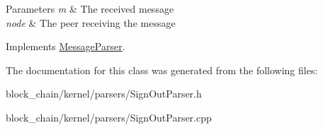 \begin{DoxyParams}{Parameters}
{\em m} & The received message \\
\hline
{\em node} & The peer receiving the message \\
\hline
\end{DoxyParams}


Implements \mbox{\hyperlink{classMessageParser_a946f3b936dc01a75d6165329b159ecfe}{Message\+Parser}}.



The documentation for this class was generated from the following files\+:\begin{DoxyCompactItemize}
\item 
block\+\_\+chain/kernel/parsers/Sign\+Out\+Parser.\+h\item 
block\+\_\+chain/kernel/parsers/Sign\+Out\+Parser.\+cpp\end{DoxyCompactItemize}
